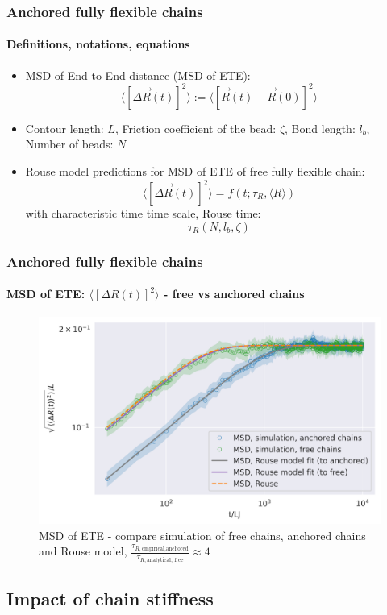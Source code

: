 \documentclass[handout]{beamer}
\newcommand{\mean}[1]{\langle #1 \rangle}
\newcommand{\E}[1]{\langle#1\rangle}
\begin{document}
\begin{frame}
    \frametitle{Anchored fully flexible chains}
    \framesubtitle{Definitions, notations, equations}
    \begin{itemize}
        \item MSD of End-to-End distance (MSD of ETE): 
        $$ \E{[\Delta \vec{R}(t)]^2} := \E{[\vec{R}(t)-\vec{R}(0)]^2} $$
        \item Contour length: $L$, Friction coefficient of the bead: $\zeta$,
        Bond length: $l_b$, Number of beads: $N$
        \item Rouse model predictions for MSD of ETE of free fully flexible chain:
        $$\E{[\Delta \vec{R}(t)]^2} = f(t; \tau_R, \E{R})$$
        with characteristic time time scale, Rouse time: $$\tau_R(N,l_b,\zeta)$$
    \end{itemize}
    
\end{frame}


\begin{frame}
    \frametitle{Anchored fully flexible chains}
    \framesubtitle{MSD of ETE: $\mean{[\Delta R(t)]^2}$ - free vs anchored chains}

    \begin{figure}[h]
        \includegraphics[trim={0.1cm 0.1cm 0.1cm 1cm},clip,width=\textwidth]{./3-exp-free-param-log.png}
        \caption{
            MSD of ETE - compare simulation of free chains, anchored chains and Rouse model,
            $\frac{\tau_{R, \textrm{empirical,anchored}}}{\tau_{R, \textrm{analytical, free}}} \approx 4$
        }
        \label{fig:full-flex-chain-free-log}
    \end{figure}
\end{frame}

\subsection{Impact of chain stiffness}
\end{document}

